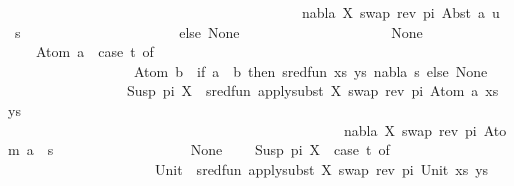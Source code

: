\begin{isabellebody}
\ \ \ \ \ \ \ \ \ \ \ \ \ \ \ \ \ \ \ \ \ \ \ \ \ \ \ \ \ \ \ \ \ \ \ \ \ \ \ \ \ \ nabla{\isacharcomma}{\kern0pt}\ {\isacharbrackleft}{\kern0pt}{\isacharparenleft}{\kern0pt}X{\isacharcomma}{\kern0pt}\ swap\ {\isacharparenleft}{\kern0pt}rev\ pi{\isacharparenright}{\kern0pt}\ {\isacharparenleft}{\kern0pt}Abst\ a\ u{\isacharparenright}{\kern0pt}{\isacharparenright}{\kern0pt}{\isacharbrackright}{\kern0pt}\ {\isasymbullet}\ s{\isacharparenright}{\kern0pt}\isanewline
\ \ \ \ \ \ \ \ \ \ \ \ \ \ \ \ \ \ \ \ \ \ else\ None\isanewline
\ \ \ \ \ \ \ \ \ \ \ \ \ \ \ \ \ \ {\isacharbar}{\kern0pt}\ {\isacharunderscore}{\kern0pt}\ {\isasymRightarrow}\ None{\isacharparenright}{\kern0pt}\isanewline
\ \ \ {\isacharbar}{\kern0pt}\ Atom\ a\ {\isasymRightarrow}\ {\isacharparenleft}{\kern0pt}case\ t{}\ of\isanewline
\ \ \ \ \ \ \ \ \ \ \ \ \ \ \ \ \ \ Atom\ b\ {\isasymRightarrow}\ if\ a\ {\isacharequal}{\kern0pt}\ b\ then\ sred{\isacharunderscore}{\kern0pt}fun\ {\isacharparenleft}{\kern0pt}{\isacharparenleft}{\kern0pt}xs{\isacharcomma}{\kern0pt}\ ys{\isacharparenright}{\kern0pt}{\isacharcomma}{\kern0pt}\ nabla{\isacharcomma}{\kern0pt}\ s{\isacharparenright}{\kern0pt}\ else\ None\isanewline
\ \ \ \ \ \ \ \ \ \ \ \ \ \ \ \ {\isacharbar}{\kern0pt}\ Susp\ pi\ X\ {\isasymRightarrow}\ sred{\isacharunderscore}{\kern0pt}fun\ {\isacharparenleft}{\kern0pt}apply{\isacharunderscore}{\kern0pt}subst\ {\isacharbrackleft}{\kern0pt}{\isacharparenleft}{\kern0pt}X{\isacharcomma}{\kern0pt}\ swap\ {\isacharparenleft}{\kern0pt}rev\ pi{\isacharparenright}{\kern0pt}\ {\isacharparenleft}{\kern0pt}Atom\ a{\isacharparenright}{\kern0pt}{\isacharparenright}{\kern0pt}{\isacharbrackright}{\kern0pt}\ {\isacharparenleft}{\kern0pt}xs{\isacharcomma}{\kern0pt}\ ys{\isacharparenright}{\kern0pt}{\isacharcomma}{\kern0pt}\isanewline
\ \ \ \ \ \ \ \ \ \ \ \ \ \ \ \ \ \ \ \ \ \ \ \ \ \ \ \ \ \ \ \ \ \ \ \ \ \ \ \ \ \ \ \ \ \ \ \ nabla{\isacharcomma}{\kern0pt}\ {\isacharbrackleft}{\kern0pt}{\isacharparenleft}{\kern0pt}X{\isacharcomma}{\kern0pt}\ swap\ {\isacharparenleft}{\kern0pt}rev\ pi{\isacharparenright}{\kern0pt}\ {\isacharparenleft}{\kern0pt}Atom\ a{\isacharparenright}{\kern0pt}{\isacharparenright}{\kern0pt}{\isacharbrackright}{\kern0pt}\ {\isasymbullet}\ s{\isacharparenright}{\kern0pt}\isanewline
\ \ \ \ \ \ \ \ \ \ \ \ \ \ \ \ {\isacharbar}{\kern0pt}\ {\isacharunderscore}{\kern0pt}\ {\isasymRightarrow}\ None{\isacharparenright}{\kern0pt}\isanewline
\ \ \ {\isacharbar}{\kern0pt}\ Susp\ pi\ X\ {\isasymRightarrow}\ {\isacharparenleft}{\kern0pt}case\ t{}\ of\isanewline
\ \ \ \ \ \ \ \ \ \ \ \ \ \ \ \ \ \ \ \ \ Unit\ {\isasymRightarrow}\ sred{\isacharunderscore}{\kern0pt}fun\ {\isacharparenleft}{\kern0pt}apply{\isacharunderscore}{\kern0pt}subst\ {\isacharbrackleft}{\kern0pt}{\isacharparenleft}{\kern0pt}X{\isacharcomma}{\kern0pt}\ swap\ {\isacharparenleft}{\kern0pt}rev\ pi{\isacharparenright}{\kern0pt}\ Unit{\isacharparenright}{\kern0pt}{\isacharbrackright}{\kern0pt}\ {\isacharparenleft}{\kern0pt}xs{\isacharcomma}{\kern0pt}\ ys{\isacharparenright}{\kern0pt}{\isacharcomma}{\kern0pt}\isanewline

\end{isabellebody}
